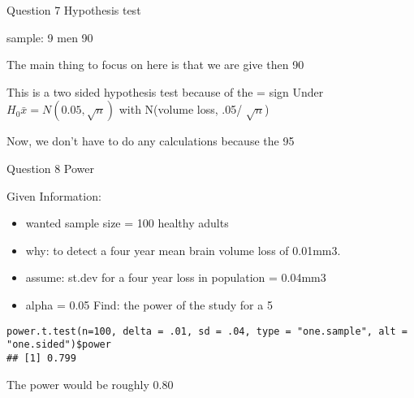 \begin{frame}[fragile]
Question 7 Hypothesis test

sample: 9 men 90%

The main thing to focus on here is that we are give then 90%

This is a two sided hypothesis test because of the = sign Under \( H_0 \bar{x} = N(0.05, \sqrt{n}) \) with N(volume loss, .05/ \( \sqrt{n} \))

Now, we don't have to do any calculations because the 95%

\end{frame}
\begin{frame}[fragile]
Question 8 Power

Given Information:
\begin{itemize}
\item wanted sample size = 100 healthy adults
\item why: to detect a four year mean brain volume loss of 0.01mm3.
\item assume: st.dev for a four year loss in population = 0.04mm3
\item alpha = 0.05 Find: the power of the study for a 5%
\end{itemize}
\begin{verbatim}
power.t.test(n=100, delta = .01, sd = .04, type = "one.sample", alt = "one.sided")$power
## [1] 0.799
\end{verbatim}
The power would be roughly 0.80

\end{frame}
